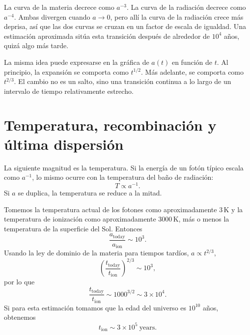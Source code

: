
La curva de la materia decrece como \(a^{-3}\). La curva de la radiación decrece como \(a^{-4}\). Ambas divergen cuando \(a\to 0\), pero allí la curva de la radiación crece más deprisa, así que las dos curvas se cruzan en un factor de escala de igualdad. Una estimación aproximada sitúa esta transición después de alrededor de \(10^4\) años, quizá algo más tarde.

La misma idea puede expresarse en la gráfica de \(a(t)\) en función de \(t\). Al principio, la expansión se comporta como \(t^{1/2}\). Más adelante, se comporta como \(t^{2/3}\). El cambio no es un salto, sino una transición continua a lo largo de un intervalo de tiempo relativamente estrecho.

\begin{classroomqa}
\end{classroomqa}

\section{Temperatura, recombinación y última dispersión}

La siguiente magnitud es la temperatura. Si la energía de un fotón típico escala como \(a^{-1}\), lo mismo ocurre con la temperatura del baño de radiación:
\begin{equation}
T\propto a^{-1}.
\end{equation}
Si \(a\) se duplica, la temperatura se reduce a la mitad.

Tomemos la temperatura actual de los fotones como aproximadamente \(3\,\mathrm K\) y la temperatura de ionización como aproximadamente \(3000\,\mathrm K\), más o menos la temperatura de la superficie del Sol. Entonces
\begin{equation}
\frac{a_{\mathrm{today}}}{a_{\mathrm{ion}}}\sim 10^3.
\end{equation}
Usando la ley de dominio de la materia para tiempos tardíos, \(a\propto t^{2/3}\),
\begin{equation}
\left(\frac{t_{\mathrm{today}}}{t_{\mathrm{ion}}}\right)^{2/3}\sim 10^3,
\end{equation}
por lo que
\begin{equation}
\frac{t_{\mathrm{today}}}{t_{\mathrm{ion}}}\sim 1000^{3/2}\sim 3\times 10^4.
\end{equation}
Si para esta estimación tomamos que la edad del universo es \(10^{10}\) años, obtenemos
\begin{equation}
t_{\mathrm{ion}}\sim 3\times 10^5\ \mathrm{years}.
\end{equation}

